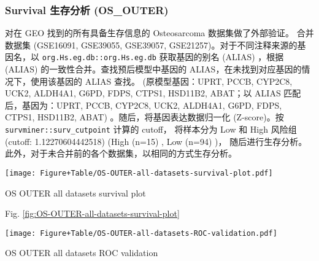 \documentclass[
]{article}
\begin{document}
\hypertarget{survival-ux751fux5b58ux5206ux6790-os_outer}{%
\subsubsection{Survival 生存分析 (OS\_OUTER)}\label{survival-ux751fux5b58ux5206ux6790-os_outer}}

对在 GEO 找到的所有具备生存信息的 Osteosarcoma 数据集做了外部验证。
合并数据集 (GSE16091, GSE39055, GSE39057, GSE21257)。对于不同注释来源的基因名，以 \texttt{org.Hs.eg.db::org.Hs.eg.db} 获取基因的别名 (ALIAS) ，根据 (ALIAS) 的一致性合并。查找预后模型中基因的 ALIAS，在未找到对应基因的情况下，使用该基因的 ALIAS 查找。 (原模型基因：UPRT, PCCB, CYP2C8, UCK2, ALDH4A1, G6PD, FDPS, CTPS1, HSD11B2, ABAT；以 ALIAS 匹配后，基因为：UPRT, PCCB, CYP2C8, UCK2, ALDH4A1, G6PD, FDPS, CTPS1, HSD11B2, ABAT) 。随后，将基因表达数据归一化 (Z-score)。按 \texttt{survminer::surv\_cutpoint} 计算的 cutoff，
将样本分为 Low 和 High 风险组 (cutoff: 1.12270604442518)
(High (n=15) , Low (n=94) )， 随后进行生存分析。此外，对于未合并前的各个数据集，以相同的方式生存分析。

\begin{center}\vspace{1.5cm}\end{center}
\def\@captype{figure}
\begin{center}
\texttt{[image: Figure+Table/OS-OUTER-all-datasets-survival-plot.pdf]}
\caption{OS OUTER all datasets survival plot}\label{fig:OS-OUTER-all-datasets-survival-plot}
\end{center}

\begin{center}\vspace{1.5cm}\end{center}

Fig. \ref{fig:OS-OUTER-all-datasets-survival-plot}

\begin{center}\vspace{1.5cm}\end{center}
\def\@captype{figure}
\begin{center}
\texttt{[image: Figure+Table/OS-OUTER-all-datasets-ROC-validation.pdf]}
\caption{OS OUTER all datasets ROC validation}\label{fig:OS-OUTER-all-datasets-ROC-validation}
\end{center}
\end{document}
